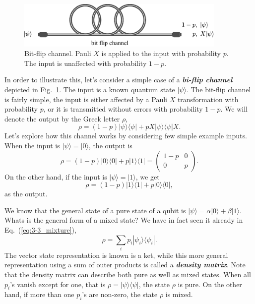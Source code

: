 \begin{figure}[t]
    \centering
    \includegraphics[width=0.9\textwidth]{lesson3/3-3_bit_flip_channel.pdf}
    \caption[Bit-flip channel]{Bit-flip channel. Pauli $X$ is applied to the input with probability $p$. The input is unaffected with probability $1-p$.}
    \label{fig:3-3_bit_flip_channel}
\end{figure}
In order to illustrate this, let's consider a simple case of a \textit{\textbf{bi-flip channel}} depicted in Fig.~\ref{fig:3-3_bit_flip_channel}.
The input is a known quantum state $|\psi\rangle$.
The bit-flip channel is fairly simple, the input is either affected by a Pauli $X$ transformation with probability $p$, or it is transmitted without errors with probability $1-p$.
We will denote the output by the Greek letter $\rho$,
\begin{equation}
    \rho = (1-p) |\psi\rangle\langle\psi| + p X|\psi\rangle\langle\psi|X.
\end{equation}
Let's explore how this channel works by considering few simple example inputs.
When the input is $|\psi\rangle = |0\rangle$, the output is
\begin{equation}
    \rho = (1-p)|0\rangle\langle0| + p|1\rangle\langle1| = \begin{pmatrix} 1-p & 0 \\ 0 & p \end{pmatrix}.
\end{equation}
On the other hand, if the input is $|\psi\rangle=|1\rangle$, we get
\begin{equation}
    \rho = (1-p)|1\rangle\langle1| + p|0\rangle\langle0|,
\end{equation}
as the output.

We know that the general state of a pure state of a qubit is $|\psi\rangle = \alpha|0\rangle + \beta|1\rangle$.
Whats is the general form of a mixed state?
We have in fact seen it already in Eq.~(\ref{eq:3-3_mixture}),
\begin{equation}
    \rho = \sum_i p_i |\psi_i\rangle\langle\psi_i|.
\end{equation}
The vector state representation is known is a ket, while this more general representation using a sum of outer products is called a \textit{\textbf{density matrix}}.
Note that the density matrix can describe both pure as well as mixed states.
When all $p_i$'s vanish except for one, that is $\rho=|\psi\rangle\langle\psi|$, the state $\rho$ is pure.
On the other hand, if more than one $p_i$'s are non-zero, the state $\rho$ is mixed.

